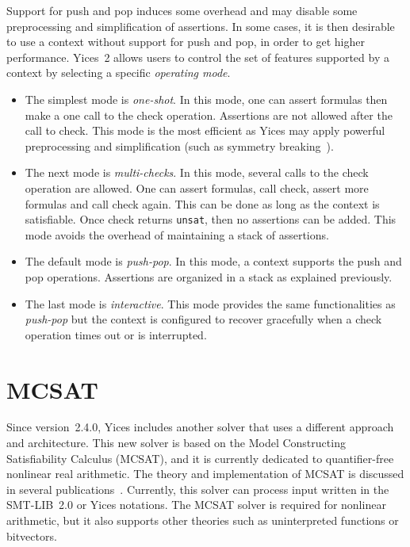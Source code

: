 \documentclass[11pt,twoside,fleqn,openright,titlepage]{cslreport}
\begin{document}
Support for  push and pop induces  some overhead and  may disable some
preprocessing and  simplification of assertions. In some  cases, it is
then desirable to  use a context without support for  push and pop, in
order to get  higher performance. Yices~2 allows users  to control the
set of  features supported by a  context by selecting  a specific {\em
  operating mode\/}.
\begin{itemize}
\item The simplest mode is {\em one-shot\/}. In this mode, one can
  assert formulas then make a one call to the check operation.
  Assertions are not allowed after the call to check. This mode is the
  most efficient as Yices may apply powerful preprocessing and
  simplification (such as symmetry breaking~\cite{Deharbe+etal:2011}).
\item The next mode is {\em multi-checks\/}. In this mode, several calls
  to the check operation are allowed. One can assert formulas, call
  check, assert more formulas and call check again. This can be done
  as long as the context is satisfiable. Once check returns
  \texttt{unsat}, then no assertions can be added. This mode avoids
  the overhead of maintaining a stack of assertions.
\item The default mode is {\em push-pop\/}. In this mode, a context
  supports the push and pop operations. Assertions are organized in a
  stack as explained previously.
\item The last mode is {\em interactive\/}. This mode provides the
  same functionalities as {\em push-pop\/} but the context is
  configured to recover gracefully when a check operation times out or
  is interrupted.
\end{itemize}


\section{MCSAT}
\label{mcsat}

Since version~2.4.0, Yices includes another solver that uses a
different approach and architecture. This new solver is based on the
Model Constructing Satisfiability Calculus (MCSAT), and it is
currently dedicated to quantifier-free nonlinear real arithmetic. The
theory and implementation of MCSAT is discussed in several
publications~\cite{Jovanovic-etal:MCSATb:2013,deMouraJovanovic:MCSAT:2013}.
Currently, this solver can process input written in the SMT-LIB~2.0 or
Yices notations. The MCSAT solver is required for nonlinear
arithmetic, but it also supports other theories such as uninterpreted
functions or bitvectors.
\end{document}
